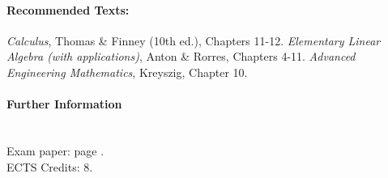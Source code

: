 \paragraph{Recommended Texts:}

\emph{Calculus}, Thomas \& Finney (10th ed.), Chapters 11-12.
\emph{Elementary Linear Algebra (with applications)}, Anton \& Rorres, Chapters 4-11.
\emph{Advanced Engineering Mathematics}, Kreyszig, Chapter 10.

\paragraph{Further Information}~\\
Exam paper: page \pageref{2E1}.\\
ECTS Credits: 8.

